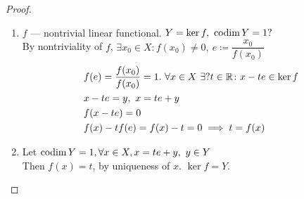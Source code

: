 \begin{proof}
  \begin{enumerate}
  \item $f$ --- nontrivial linear functional. $Y = \ker{f},\ \codim{Y} = 1?$ \\
    By nontriviality of $f$, $\exists x_0 \in X \colon f(x_0) \neq 0,\ e \coloneqq
    \dfrac{x_0}{f(x_0)}$ 
    \begin{align*}
      &f(e) = \dfrac{f(x_0)}{f(x_0)} = 1.\ \forall x \in X\ \exists ? t \in \mathbb{R}
      \colon x - t e \in \ker{f} \\
      &x - te = y,\ x = te + y \\
      &f(x - te) = 0  \\
      &f(x) - tf(e) = f(x) - t = 0 \implies t = f(x)
    \end{align*}

  \item Let $\operatorname{codim}{Y} = 1, \forall x \in X, x = te + y,\ y \in Y$ \\
    Then $f(x) = t$, by uniqueness of $x$. $\ker{f} = Y$.
  \end{enumerate}
\end{proof}